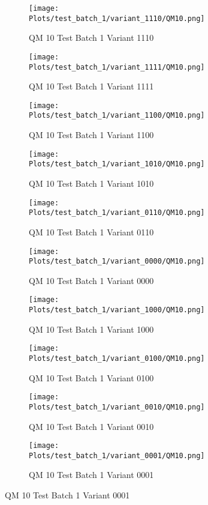 \documentclass{DissertateFigs}
\begin{document}
\begin{figure}[t!]
    \begin{subfigure}{0.47\textwidth}
    \texttt{[image: Plots/test\_batch\_1/variant\_1110/QM10.png]}
    \caption{QM 10 Test Batch 1 Variant 1110}
    \end{subfigure}
    \begin{subfigure}{0.47\textwidth}
    \texttt{[image: Plots/test\_batch\_1/variant\_1111/QM10.png]}
    \caption{QM 10 Test Batch 1 Variant 1111}
    \end{subfigure}

\medskip

    \begin{subfigure}{0.47\textwidth}
    \texttt{[image: Plots/test\_batch\_1/variant\_1100/QM10.png]}
    \caption{QM 10 Test Batch 1 Variant 1100}
    \end{subfigure}
    \begin{subfigure}{0.47\textwidth}
    \texttt{[image: Plots/test\_batch\_1/variant\_1010/QM10.png]}
    \caption{QM 10 Test Batch 1 Variant 1010}
    \end{subfigure}

\medskip

    \begin{subfigure}{0.47\textwidth}
    \texttt{[image: Plots/test\_batch\_1/variant\_0110/QM10.png]}
    \caption{QM 10 Test Batch 1 Variant 0110}
    \end{subfigure}
    \begin{subfigure}{0.47\textwidth}
    \texttt{[image: Plots/test\_batch\_1/variant\_0000/QM10.png]}
    \caption{QM 10 Test Batch 1 Variant 0000}
    \end{subfigure}

\medskip

    \begin{subfigure}{0.47\textwidth}
    \texttt{[image: Plots/test\_batch\_1/variant\_1000/QM10.png]}
    \caption{QM 10 Test Batch 1 Variant 1000}
    \end{subfigure}
    \begin{subfigure}{0.47\textwidth}
    \texttt{[image: Plots/test\_batch\_1/variant\_0100/QM10.png]}
    \caption{QM 10 Test Batch 1 Variant 0100}
    \end{subfigure}

\medskip

    \begin{subfigure}{0.47\textwidth}
    \texttt{[image: Plots/test\_batch\_1/variant\_0010/QM10.png]}
    \caption{QM 10 Test Batch 1 Variant 0010}
    \end{subfigure}
    \begin{subfigure}{0.47\textwidth}
    \texttt{[image: Plots/test\_batch\_1/variant\_0001/QM10.png]}
    \caption{QM 10 Test Batch 1 Variant 0001}
    \end{subfigure}


\end{figure}
\end{document}
